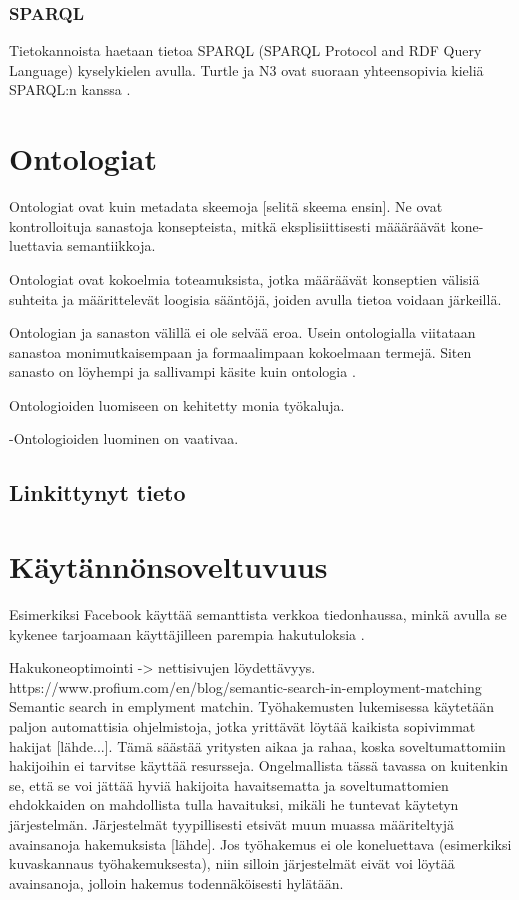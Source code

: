 \documentclass[finnish, 12pt, a4paper, elec, utf8, pdfa, online]{aaltothesis}
\begin{document}
\subsubsection{SPARQL}
Tietokannoista haetaan tietoa SPARQL (SPARQL Protocol and RDF Query Language) kyselykielen avulla. Turtle ja N3 ovat suoraan yhteensopivia kieliä SPARQL:n kanssa \cite{W3C_turtle}.

\clearpage
\section{Ontologiat}
Ontologiat ovat kuin metadata skeemoja [selitä skeema ensin].
Ne ovat kontrolloituja sanastoja konsepteista, mitkä eksplisiittisesti määäräävät kone-luettavia semantiikkoja.
\cite{ontology_learning}

Ontologiat ovat kokoelmia toteamuksista, jotka määräävät konseptien välisiä suhteita ja määrittelevät loogisia sääntöjä, joiden avulla tietoa voidaan järkeillä. \cite{Berners_visio}


Ontologian ja sanaston välillä ei ole selvää eroa. Usein ontologialla viitataan sanastoa monimutkaisempaan ja formaalimpaan kokoelmaan termejä. Siten sanasto on löyhempi ja sallivampi käsite kuin ontologia \cite{vocabulary}.


Ontologioiden luomiseen on kehitetty monia työkaluja.

-Ontologioiden luominen on vaativaa.



\subsection{Linkittynyt tieto}

\clearpage
\section{Käytännönsoveltuvuus}
Esimerkiksi Facebook käyttää semanttista verkkoa tiedonhaussa, minkä avulla se kykenee tarjoamaan käyttäjilleen parempia hakutuloksia \cite{Facebook}.

Hakukoneoptimointi -> nettisivujen löydettävyys.
https://www.profium.com/en/blog/semantic-search-in-employment-matching
Semantic search in emplyment matchin.
Työhakemusten lukemisessa käytetään paljon automattisia ohjelmistoja, jotka yrittävät löytää kaikista sopivimmat hakijat [lähde...]. Tämä säästää yritysten aikaa ja rahaa, koska soveltumattomiin hakijoihin ei tarvitse käyttää resursseja. Ongelmallista tässä tavassa on kuitenkin se, että se voi jättää hyviä hakijoita havaitsematta ja soveltumattomien ehdokkaiden on mahdollista tulla havaituksi, mikäli he tuntevat käytetyn järjestelmän. Järjestelmät tyypillisesti etsivät muun muassa määriteltyjä avainsanoja hakemuksista [lähde]. Jos työhakemus ei ole koneluettava (esimerkiksi kuvaskannaus työhakemuksesta), niin silloin järjestelmät eivät voi löytää avainsanoja, jolloin hakemus todennäköisesti hylätään.
\end{document}

